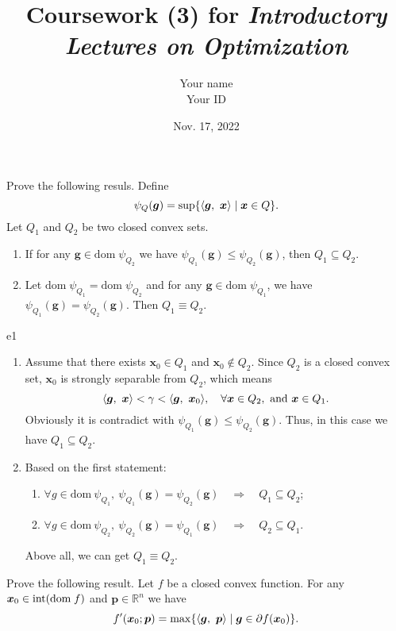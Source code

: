 \documentclass{article}
\title{Coursework (3) for \emph{Introductory Lectures on Optimization}}
\author{Your name \\ Your ID}
\date{Nov. 17, 2022}
\newcommand{\RBB}{\mathbb{R}}
\newcommand{\xB}{\bm{x}}
\newcommand{\gB}{\bm{g}}
\newcommand{\pB}{\bm{p}}
\newcommand{\domf}{\textrm{dom\;}f}
\begin{document}
\maketitle

\begin{excercise}\label{e1}
Prove the following resuls. Define 
\[
\psi_{Q}(\gB) = \sup \{ \innerproduct{\gB}{\xB} \mid \xB \in Q  \}.
\]
Let $Q_1$ and $Q_2$ be two closed convex sets.
\begin{enumerate}
	\item If for any $\gB \in \textrm{dom}\; \psi_{Q_2}$ we have $\psi_{Q_1} (\gB) \leq \psi_{Q_2} (\gB)$, then $Q_1 \subseteq Q_2$. 
	\item Let  $\textrm{dom}\; \psi_{Q_1} = \textrm{dom}\; \psi_{Q_2}$ and for any $\gB \in \textrm{dom}\; \psi_{Q_1}$, we have $\psi_{Q_1} (\gB) = \psi_{Q_2} (\gB)$. Then $Q_1 \equiv Q_2$.
\end{enumerate}
\end{excercise}

\begin{PROOF}{e1}
	\begin{enumerate}
		\item {
			Assume that there exists \(\xB_0 \in Q_1\) and \(\xB_0 \notin Q_2\). Since \(Q_2\) is a closed convex set, \(\xB_0\)
			is strongly separable from \(Q_2\), which means
			\[
				\innerproduct{\gB}{\xB} < \gamma  < \innerproduct{\gB}{\xB_0}, \quad \forall \xB \in Q_2, ~\text{and}~ \xB \in Q_1.
			\]
			Obviously it is contradict with \(\psi_{Q_1}(\gB) \le \psi_{Q_2}(\gB)\). Thus, in this case we have \(Q_1 \subseteq Q_2\).
		}
		\item {
			Based on the first statement:
			\begin{enumerate}
				\item \(\forall g \in \mathrm{dom}~\psi_{Q_1},~\psi_{Q_1}(\gB) = \psi_{Q_2}(\gB) \quad \Longrightarrow \quad Q_1 \subseteq Q_2\);
				\item \(\forall g \in \mathrm{dom}~\psi_{Q_2},~\psi_{Q_2}(\gB) = \psi_{Q_1}(\gB) \quad \Longrightarrow \quad Q_2 \subseteq Q_1\).
			\end{enumerate}
			Above all, we can get \(Q_1 \equiv Q_2\).
		}
	\end{enumerate}
	
\end{PROOF}

\begin{excercise}\label{e2}
Prove the following result.
Let $f$ be a closed convex function. For any $\xB_0 \in \textrm{int}(\domf)$ and $\pB \in \RBB^n$ we have
\begin{equation}
	f'(\xB_0; \pB) = \max \{ \innerproduct{\gB}{\pB} \mid \gB \in \partial f(\xB_0) \}.\nonumber
\end{equation}
\end{excercise}
\end{document}
